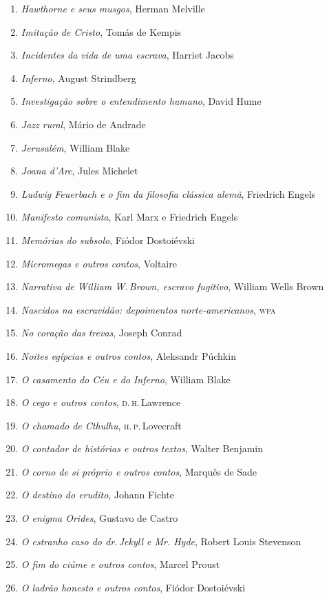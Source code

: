 \begin{enumerate}
\item \textit{Hawthorne e seus musgos}, Herman Melville
\item \textit{Imitação de Cristo}, Tomás de Kempis
\item \textit{Incidentes da vida de uma escrava}, Harriet Jacobs
\item \textit{Inferno}, August Strindberg
\item \textit{Investigação sobre o entendimento humano}, David Hume
\item \textit{Jazz rural}, Mário de Andrade
\item \textit{Jerusalém}, William Blake
\item \textit{Joana d'Arc}, Jules Michelet
\item \textit{Ludwig Feuerbach e o fim da filosofia clássica alemã}, Friedrich Engels
\item \textit{Manifesto comunista}, Karl Marx e Friedrich Engels
\item \textit{Memórias do subsolo}, Fiódor Dostoiévski
\item \textit{Micromegas e outros contos}, Voltaire
\item \textit{Narrativa de William W.\,Brown, escravo fugitivo}, William Wells Brown
\item \textit{Nascidos na escravidão: depoimentos norte-americanos}, \textsc{wpa}
\item \textit{No coração das trevas}, Joseph Conrad
\item \textit{Noites egípcias e outros contos}, Aleksandr Púchkin
\item \textit{O casamento do Céu e do Inferno}, William Blake
\item \textit{O cego e outros contos}, \textsc{d.\,h}.\,Lawrence
\item \textit{O chamado de Cthulhu}, \textsc{h.\,p.}\,Lovecraft
\item \textit{O contador de histórias e outros textos}, Walter Benjamin
\item \textit{O corno de si próprio e outros contos}, Marquês de Sade
\item \textit{O destino do erudito}, Johann Fichte
\item \textit{O enigma Orides}, Gustavo de Castro
\item \textit{O estranho caso do dr.\,Jekyll e Mr. Hyde}, Robert Louis Stevenson
\item \textit{O fim do ciúme e outros contos}, Marcel Proust
\item \textit{O ladrão honesto e outros contos}, Fiódor Dostoiévski

\end{enumerate}
